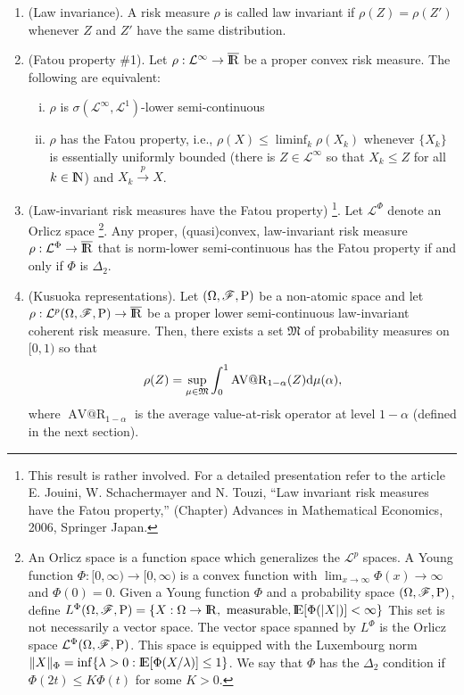 \documentclass[a4paper,10pt]{scrbook}
\begin{document}
\begin{enumerate}
 \item (Law invariance). A risk measure $\rho$ is called law invariant if $\rho(Z) = \rho(Z')$ whenever 
       $Z$ and $Z'$ have the same distribution.
       
 \item (Fatou property \#1). Let $\rho:\mathcal{L}^\infty\to \barre$ be a proper convex risk measure. 
       The following are equivalent:
       \begin{enumerate}[i.]
        \item $\rho$ is $\sigma(\mathcal{L}^\infty, \mathcal{L}^1)$-lower semi-continuous
        \item $\rho$ has the Fatou property, i.e., $\rho(X) \leq \liminf_{k}\rho(X_k)$ whenever
              $\{X_k\}$ is essentially uniformly bounded (there is $Z\in\mathcal{L}^\infty$ so that $X_k\leq Z$ for all $k\in\N$)
              and $X_k\overset{p}{\longrightarrow}X$.
       \end{enumerate}

 \item (Law-invariant risk measures have the Fatou property)%
	  \footnote{This result is rather involved. For a detailed
	  presentation refer to the article E. Jouini, W. Schachermayer and N. Touzi, 
	  ``Law invariant risk measures have 
	  the Fatou property,'' (Chapter) Advances in Mathematical Economics, 2006, Springer Japan.}.
       Let $\mathcal{L}^\Phi$ denote an Orlicz space%
	  \footnote{An Orlicz space is a function space which generalizes 
	            the $\mathcal{L}^p$ spaces. A Young function $\Phi:[0,\infty)\to[0,\infty)$ is a convex function 
	            with $\lim_{x\to\infty} \Phi(x)\to\infty$ and $\Phi(0)= 0$.
	            Given a Young function $\Phi$ and a probability space $(\Omega,\mathscr{F},\mathrm{P})$, define 
	            $L^\Phi\ofp= \{X:\Omega\to\Re, \text{ measurable}, \E[\Phi(|X|)] < \infty\}$
	            This set is not necessarily a vector space. The vector space spanned by $L^\Phi$
	            is the Orlicz space $\mathcal{L}^\Phi(\Omega,\mathscr{F},\mathrm{P})$. This space is equipped with the Luxembourg 
	            norm $\|X\|_\Phi = \inf\{\lambda>0:\E[\Phi(X/\lambda)]\leq 1\}$. We say that $\Phi$
	            has the $\Delta_2$ condition if $\Phi(2t) \leq K \Phi(t)$ for some $K>0$.}. 
       Any proper, (quasi)convex, law-invariant risk measure $\rho:\mathcal{L}^\Phi\to\barre$
       that is norm-lower semi-continuous has the Fatou property if and only if $\Phi$ is $\Delta_2$.
 
 \item (Kusuoka representations). Let $(\Omega,\mathscr{F},\mathrm{P})$ be a non-atomic space and let $\rho:\mathcal{L}^p\ofp\to\barre$ be a proper
       lower semi-continuous law-invariant coherent risk measure. Then, there exists a set $\mathfrak{M}$ of probability measures 
       on $[0,1)$ so that 
       \[
        \rho(Z) = \sup_{\mu\in\mathfrak{M}}\int_{0}^{1}\operatorname{AV@R}_{1-\alpha}(Z)\mathrm{d}\mu(\alpha),
       \]
       where $\operatorname{AV@R}_{1-\alpha}$ is the average value-at-risk operator at level $1-\alpha$ (defined 
       in the next section).


\end{enumerate}
\end{document}
